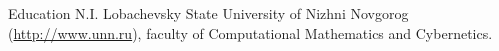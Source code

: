 \begin{rubric}{Education}
  \entry*[2004 --- 2010] N.I. Lobachevsky State University of Nizhni
  Novgorog (\url{http://www.unn.ru}), faculty of Computational
  Mathematics and Cybernetics.
\end{rubric}
